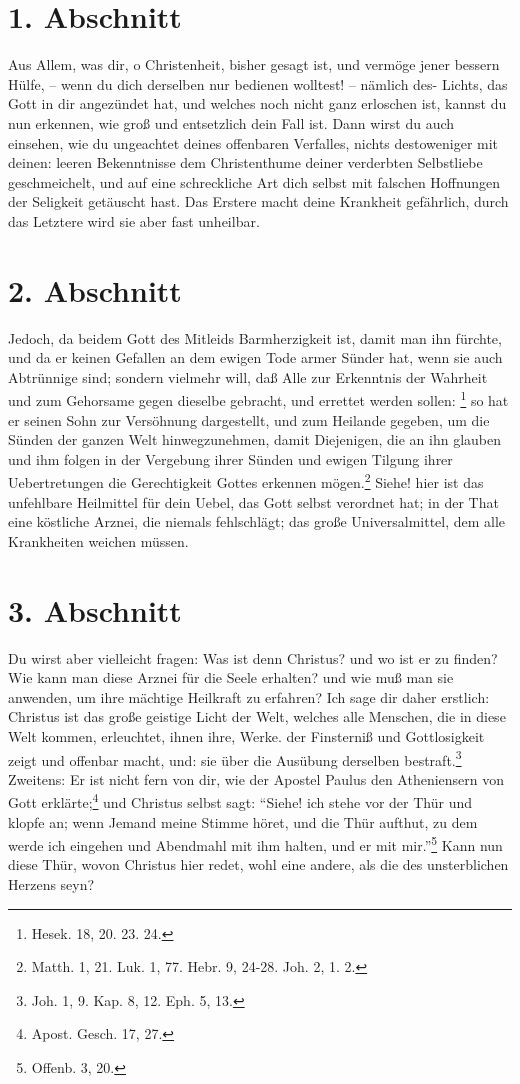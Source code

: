 \section{1. Abschnitt}

Aus Allem, was dir, o Christenheit, bisher gesagt ist, und vermöge jener bessern Hülfe, – wenn du dich derselben nur bedienen wolltest! -- nämlich des- Lichts, das Gott in dir angezündet hat, und welches noch nicht ganz erloschen ist, kannst du nun erkennen, wie groß und entsetzlich dein Fall ist. Dann wirst du auch einsehen, wie du ungeachtet deines offenbaren Verfalles, nichts destoweniger mit deinen: leeren Bekenntnisse dem Christenthume deiner verderbten Selbstliebe geschmeichelt, und auf eine schreckliche Art dich selbst mit falschen Hoffnungen der Seligkeit getäuscht hast. Das Erstere macht deine Krankheit gefährlich, durch das Letztere wird sie aber fast unheilbar.

\section{2. Abschnitt}

Jedoch, da beidem Gott des Mitleids Barmherzigkeit ist, damit man ihn
fürchte, und da er keinen Gefallen an dem ewigen Tode armer Sünder hat, wenn
sie auch Abtrünnige sind; sondern vielmehr will, daß Alle zur Erkenntnis der
Wahrheit und zum Gehorsame gegen dieselbe gebracht, und errettet werden
sollen: \footnote{Hesek. 18, 20. 23. 24.} so hat er seinen Sohn zur Versöhnung
dargestellt, und zum Heilande gegeben, um die Sünden der ganzen Welt
hinwegzunehmen, damit Diejenigen, die an ihn glauben und ihm folgen in der
Vergebung ihrer Sünden und ewigen Tilgung ihrer Uebertretungen die
Gerechtigkeit Gottes erkennen mögen.\footnote{Matth. 1, 21. Luk. 1, 77. Hebr.
9, 24-28. Joh. 2, 1. 2.} Siehe! hier ist das unfehlbare Heilmittel für dein
Uebel, das Gott selbst verordnet hat; in der That eine köstliche Arznei, die
niemals fehlschlägt; das große Universalmittel, dem alle Krankheiten weichen
müssen.

\section{3. Abschnitt}

Du wirst aber vielleicht fragen: Was ist denn Christus? und wo ist er zu finden? Wie kann man diese Arznei für die Seele erhalten? und wie muß man sie anwenden, um ihre mächtige Heilkraft zu erfahren? Ich sage dir daher erstlich: Christus ist das große geistige Licht der Welt, welches alle Menschen, die in diese Welt kommen, erleuchtet, ihnen ihre, Werke. der Finsterniß und Gottlosigkeit zeigt und offenbar macht, und: sie über die Ausübung derselben bestraft.\footnote{Joh. 1, 9. Kap. 8, 12. Eph. 5, 13.} Zweitens: Er ist nicht fern von dir, wie der Apostel Paulus den Atheniensern von Gott erklärte;\footnote{Apost. Gesch. 17, 27.} und Christus selbst sagt: "`Siehe! ich stehe vor  der Thür und klopfe an; wenn Jemand meine Stimme höret, und die Thür aufthut, zu dem werde ich eingehen und Abendmahl mit ihm halten, und er mit mir."'\footnote{Offenb. 3, 20.} Kann nun diese Thür, wovon Christus hier redet, wohl eine andere, als die des unsterblichen Herzens seyn?


